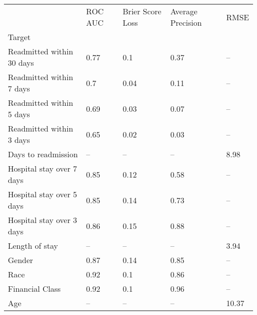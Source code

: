 \begin{tabular}{lllll}
\toprule
{} & ROC AUC & Brier Score Loss & Average Precision &   RMSE \\
Target                    &         &                  &                   &        \\
\midrule
Readmitted within 30 days &    0.77 &              0.1 &              0.37 &     -- \\
Readmitted within 7 days  &     0.7 &             0.04 &              0.11 &     -- \\
Readmitted within 5 days  &    0.69 &             0.03 &              0.07 &     -- \\
Readmitted within 3 days  &    0.65 &             0.02 &              0.03 &     -- \\
Days to readmission       &      -- &               -- &                -- &   8.98 \\
Hospital stay over 7 days &    0.85 &             0.12 &              0.58 &     -- \\
Hospital stay over 5 days &    0.85 &             0.14 &              0.73 &     -- \\
Hospital stay over 3 days &    0.86 &             0.15 &              0.88 &     -- \\
Length of stay            &      -- &               -- &                -- &   3.94 \\
Gender                    &    0.87 &             0.14 &              0.85 &     -- \\
Race                      &    0.92 &              0.1 &              0.86 &     -- \\
Financial Class           &    0.92 &              0.1 &              0.96 &     -- \\
Age                       &      -- &               -- &                -- &  10.37 \\
\bottomrule
\end{tabular}
